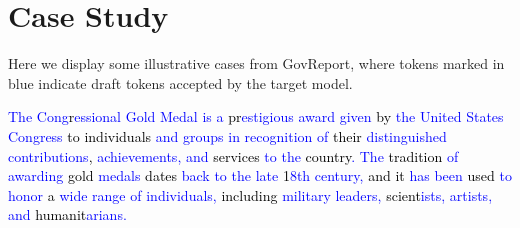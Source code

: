 \section{Case Study}
\label{appendix:visualization}
Here we display some illustrative cases from GovReport, where tokens marked in blue indicate draft tokens accepted by the target model. 

\begin{tcolorbox}
    \textcolor{blue}{The} \textcolor{blue}{Cong}\textcolor{black}{r}\textcolor{blue}{essional} \textcolor{blue}{Gold} \textcolor{blue}{Medal} \textcolor{blue}{is} \textcolor{blue}{a} \textcolor{black}{pr}\textcolor{blue}{estig}\textcolor{blue}{ious} \textcolor{blue}{award} \textcolor{blue}{given} \textcolor{black}{by} \textcolor{blue}{the} \textcolor{blue}{United} \textcolor{blue}{States} \textcolor{blue}{Congress} \textcolor{black}{to} \textcolor{black}{individuals} \textcolor{blue}{and} \textcolor{blue}{groups} \textcolor{blue}{in} \textcolor{blue}{recognition} \textcolor{blue}{of} \textcolor{black}{their} \textcolor{blue}{distinguished} \textcolor{blue}{contributions}\textcolor{black}{,} \textcolor{blue}{achiev}\textcolor{blue}{ements}\textcolor{blue}{,} \textcolor{blue}{and} \textcolor{black}{services} \textcolor{blue}{to} \textcolor{blue}{the} \textcolor{black}{country}\textcolor{blue}{.} \textcolor{blue}{The} \textcolor{black}{tradition} \textcolor{blue}{of} \textcolor{blue}{award}\textcolor{blue}{ing} \textcolor{black}{gold} \textcolor{blue}{med}\textcolor{blue}{als} \textcolor{black}{dates} \textcolor{blue}{back} \textcolor{blue}{to} \textcolor{blue}{the} \textcolor{blue}{late} \textcolor{blue}{}\textcolor{black}{1}\textcolor{blue}{8}\textcolor{blue}{th} \textcolor{blue}{century}\textcolor{blue}{,} \textcolor{black}{and} \textcolor{black}{it} \textcolor{blue}{has} \textcolor{blue}{been} \textcolor{black}{used} \textcolor{blue}{to} \textcolor{blue}{honor} \textcolor{black}{a} \textcolor{blue}{wide} \textcolor{blue}{range} \textcolor{blue}{of} \textcolor{blue}{individuals}\textcolor{blue}{,} \textcolor{black}{including} \textcolor{blue}{military} \textcolor{blue}{leaders}\textcolor{blue}{,} \textcolor{black}{scient}\textcolor{blue}{ists}\textcolor{blue}{,} \textcolor{blue}{artists}\textcolor{blue}{,} \textcolor{blue}{and} \textcolor{black}{human}\textcolor{black}{it}\textcolor{blue}{ari}\textcolor{blue}{ans}\textcolor{blue}{.}
    

\end{tcolorbox}
